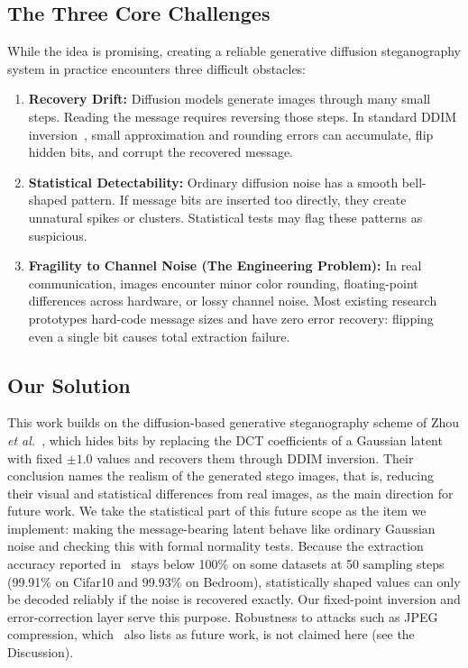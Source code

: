 \documentclass[conference]{IEEEtran}
\begin{document}
\subsection{The Three Core Challenges}
While the idea is promising, creating a reliable generative diffusion steganography system in practice encounters three difficult obstacles:
\begin{enumerate}
    \item \textbf{Recovery Drift:} Diffusion models generate images through many small steps. Reading the message requires reversing those steps. In standard DDIM inversion~\cite{song2020denoising}, small approximation and rounding errors can accumulate, flip hidden bits, and corrupt the recovered message.
    \item \textbf{Statistical Detectability:} Ordinary diffusion noise has a smooth bell-shaped pattern. If message bits are inserted too directly, they create unnatural spikes or clusters. Statistical tests may flag these patterns as suspicious.
    \item \textbf{Fragility to Channel Noise (The Engineering Problem):} In real communication, images encounter minor color rounding, floating-point differences across hardware, or lossy channel noise. Most existing research prototypes hard-code message sizes and have zero error recovery: flipping even a single bit causes total extraction failure.
\end{enumerate}

\subsection{Our Solution}
This work builds on the diffusion-based generative steganography scheme of Zhou \textit{et al.}~\cite{zhou2025improved}, which hides bits by replacing the DCT coefficients of a Gaussian latent with fixed $\pm 1.0$ values and recovers them through DDIM inversion. Their conclusion names the realism of the generated stego images, that is, reducing their visual and statistical differences from real images, as the main direction for future work. We take the statistical part of this future scope as the item we implement: making the message-bearing latent behave like ordinary Gaussian noise and checking this with formal normality tests. Because the extraction accuracy reported in~\cite{zhou2025improved} stays below 100\% on some datasets at 50 sampling steps (99.91\% on Cifar10 and 99.93\% on Bedroom), statistically shaped values can only be decoded reliably if the noise is recovered exactly. Our fixed-point inversion and error-correction layer serve this purpose. Robustness to attacks such as JPEG compression, which~\cite{zhou2025improved} also lists as future work, is not claimed here (see the Discussion).
\end{document}
